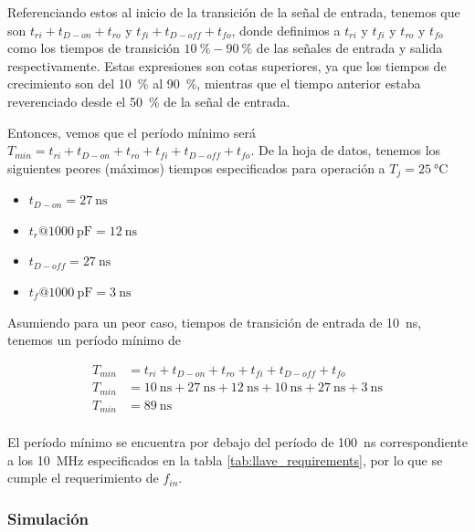 Referenciando estos al inicio de la transición de la señal de entrada, tenemos
que son $t_{ri}+t_{D-on}+t_{ro}$ y $t_{fi}+t_{D-off}+t_{fo}$, donde definimos a
$t_{ri}$ y $t_{fi}$ y $t_{ro}$ y $t_{fo}$ como los tiempos de transición
$\qty{10}{\percent}-\qty{90}{\percent}$ de las señales de entrada y salida
respectivamente. Estas expresiones son cotas superiores, ya que los tiempos de
crecimiento son del \qty{10}{\percent} al \qty{90}{\percent}, mientras que el
tiempo anterior estaba reverenciado desde el \qty{50}{\percent} de la señal de
entrada.

Entonces, vemos que el período mínimo será $T_{min} = t_{ri} + t_{D-on} + t_{ro}
+ t_{fi} + t_{D-off} + t_{fo}$. De la hoja de datos, tenemos los siguientes
peores (máximos) tiempos especificados para operación a $T_j=\qty{25}{\celsius}$

\begin{itemize}
    \item $t_{D-on} = \qty{27}{\nano\second}$
    \item $t_{r} @ \qty{1000}{\pico\farad} = \qty{12}{\nano\second}$
    \item $t_{D-off} = \qty{27}{\nano\second}$
    \item $t_{f} @ \qty{1000}{\pico\farad} = \qty{3}{\nano\second}$
\end{itemize}

Asumiendo para un peor caso, tiempos de transición de entrada de
\qty{10}{\nano\second},  tenemos un período mínimo de

\begin{equation}
    \begin{aligned}
        T_{min} &= t_{ri} + t_{D-on} + t_{ro} + t_{fi} + t_{D-off} + t_{fo} \\
        T_{min} &= \qty{10}{\nano\second} + \qty{27}{\nano\second} +
        \qty{12}{\nano\second} + \qty{10}{\nano\second} + \qty{27}{\nano\second}
        + \qty{3}{\nano\second} \\
        T_{min} &= \qty{89}{\nano\second} \\
    \end{aligned}
\end{equation}

El período mínimo se encuentra por debajo del período de \qty{100}{\nano\second}
correspondiente a los \qty{10}{\mega\hertz} especificados en
la tabla \ref{tab:llave_requirements}, por lo que se cumple el requerimiento de $f_{in}$.

\subsubsection{Simulación}

